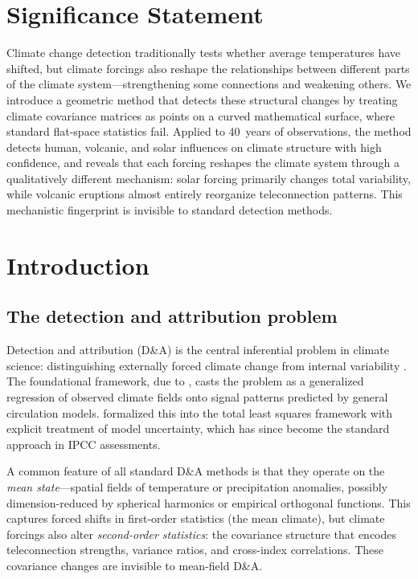 \documentclass[preprint,12pt]{elsarticle}
\begin{document}
\section*{Significance Statement}
Climate change detection traditionally tests whether average temperatures have shifted, but climate forcings also reshape the relationships between different parts of the climate system---strengthening some connections and weakening others.
We introduce a geometric method that detects these structural changes by treating climate covariance matrices as points on a curved mathematical surface, where standard flat-space statistics fail.
Applied to 40~years of observations, the method detects human, volcanic, and solar influences on climate structure with high confidence, and reveals that each forcing reshapes the climate system through a qualitatively different mechanism: solar forcing primarily changes total variability, while volcanic eruptions almost entirely reorganize teleconnection patterns.
This mechanistic fingerprint is invisible to standard detection methods.

\linenumbers

\section{Introduction}\label{sec:intro}

\subsection{The detection and attribution problem}

Detection and attribution (D\&A) is the central inferential problem in climate science: distinguishing externally forced climate change from internal variability \citep{IPCC_AR6_Ch3}.
The foundational framework, due to \citet{Hasselmann1979}, casts the problem as a generalized regression of observed climate fields onto signal patterns predicted by general circulation models.
\citet{AllenStott2003} formalized this into the total least squares framework with explicit treatment of model uncertainty, which has since become the standard approach in IPCC assessments.

A common feature of all standard D\&A methods is that they operate on the \emph{mean state}---spatial fields of temperature or precipitation anomalies, possibly dimension-reduced by spherical harmonics or empirical orthogonal functions.
This captures forced shifts in first-order statistics (the mean climate), but climate forcings also alter \emph{second-order statistics}: the covariance structure that encodes teleconnection strengths, variance ratios, and cross-index correlations.
These covariance changes are invisible to mean-field D\&A.
\end{document}
